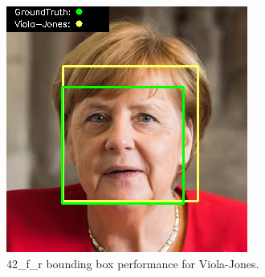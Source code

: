 \documentclass{l4proj}
\begin{document}
\begin{appendices}
\begin{figure}[h!]
  \centering
  \begin{minipage}{0.49\textwidth}
    \centering
     \includegraphics[width=\textwidth]{images/appendix/viola/42.png}
    \caption{42\_f\_r bounding box performance for Viola-Jones.}
    \label{whoopi_result}
  \end{minipage}
    \hfill
    \begin{minipage}{0.49\textwidth}
    \centering

\end{minipage}
\end{figure}
\end{appendices}
\end{document}

